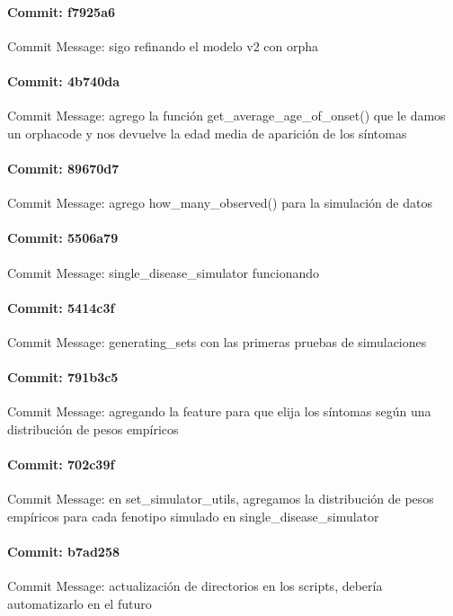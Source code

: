 \documentclass{article}
\begin{document}
\paragraph{Commit: f7925a6}
Commit Message: sigo refinando el modelo v2 con orpha

\paragraph{Commit: 4b740da}
Commit Message: agrego la función get_average_age_of_onset() que le damos un orphacode y nos devuelve la edad media de aparición de los síntomas

\paragraph{Commit: 89670d7}
Commit Message: agrego how_many_observed() para la simulación de datos

\paragraph{Commit: 5506a79}
Commit Message: single_disease_simulator funcionando

\paragraph{Commit: 5414c3f}
Commit Message: generating_sets con las primeras pruebas de simulaciones

\paragraph{Commit: 791b3c5}
Commit Message: agregando la feature para que elija los síntomas según una distribución de pesos empíricos

\paragraph{Commit: 702c39f}
Commit Message: en set_simulator_utils, agregamos la distribución de pesos empíricos para cada fenotipo simulado en single_disease_simulator

\paragraph{Commit: b7ad258}
Commit Message: actualización de directorios en los scripts, debería automatizarlo en el futuro

\end{document}
